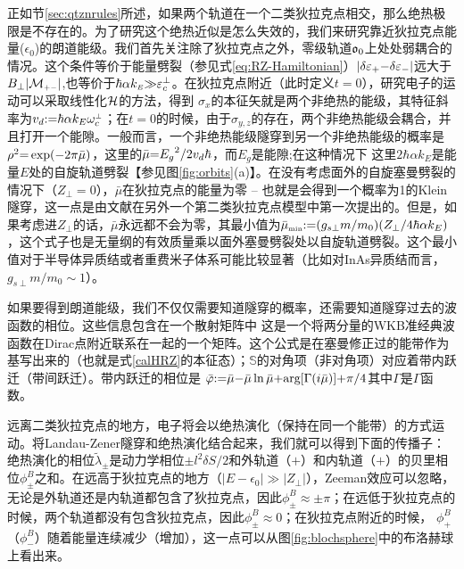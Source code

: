 正如节\ref{sec:qtznrules}所述，如果两个轨道在一个二类狄拉克点相交，那么绝热极限是不存在的。为了研究这个绝热近似是怎么失效的，我们来研究靠近狄拉克点能量($\epsilon_0$)的朗道能级。我们首先关注除了狄拉克点之外，零级轨道$\mathfrak{o}_0$上处处弱耦合的情况。这个条件等价于能量劈裂（参见式\ref{eq:RZ-Hamiltonian}）$|\delta \varepsilon_+{-}\delta \varepsilon_-|$远大于$B_\perp|{\cal M}_{\scriptscriptstyle{+-}}|$,也等价于$\hbar\alpha k_{\scriptscriptstyle{E}}{\gg}\varepsilon_c^\perp$。在狄拉克点附近（此时定义$t{=}0$），研究电子的运动可以采取线性化$\mathcal{H}$的方法，得到
$\sigma_x$的本征矢就是两个非绝热的能级，其特征斜率为$v_d{:}{=}\hbar\alpha k_E\omega^{\scriptscriptstyle{\perp}}_c$；在$t{=}0$的时候，由于$\sigma_{y,z}$的存在，两个非绝热能级会耦合，并且打开一个能隙。一般而言，一个非绝热能级隧穿到另一个非绝热能级的概率是$\rho^2{=}\exp(-2\pi\bar{\mu})$，这里的$\bar{\mu}{=}{E_g}^2/{2v_d \hbar}$，而$E_g$是能隙\cite{wittig_landauzener_2005,lifshitz_e.m._quantum_1991};在这种情况下
这里$2\hbar\alpha k_E$是能量$E$处的自旋轨道劈裂【参见图\ref{fig:orbits}(a)】。在没有考虑面外的自旋塞曼劈裂的情况下（$Z_\perp{=}0$），$\bar{\mu}$在狄拉克点的能量为零 -- 也就是会得到一个概率为1的Klein隧穿，这一点是由文献在另外一个第二类狄拉克点模型中第一次提出的。但是，如果考虑进$Z_\perp$的话，$\bar{\mu}$永远都不会为零，其最小值为$\bar{\mu}_{\scriptscriptstyle{\text{min}}}{:}{=} (g_{s\perp} m/m_0)(Z_\perp/4\hbar\alpha k_{E})$，这个式子也是无量纲的有效质量乘以面外塞曼劈裂处以自旋轨道劈裂。这个最小值对于半导体异质结或者重费米子体系可能比较显著（比如对InAs异质结而言，$g_{s\perp}m/m_0{\sim} 1$）。


如果要得到朗道能级，我们不仅仅需要知道隧穿的概率，还需要知道隧穿过去的波函数的相位。这些信息包含在一个散射矩阵中\cite{AALG,kaganov_coherent_1983}
这是一个将两分量的WKB准经典波函数在Dirac点附近联系在一起的一个矩阵。这个公式是在塞曼修正过的能带作为基写出来的（也就是式\ref{calHRZ}的本征态）；$\mathbb{S}$的对角项（非对角项）对应着带内跃迁（带间跃迁）。带内跃迁的相位是 $\bar{\varphi}{:}{=}\bar{\mu}{-}\bar{\mu}\ln\bar{\mu}{+}\text{arg}[\Gamma(i\bar{\mu})]{+}\pi/4$其中$\Gamma$是$\Gamma$函数。

远离二类狄拉克点的地方，电子将会以绝热演化（保持在同一个能带）的方式运动。将Landau-Zener隧穿和绝热演化结合起来，我们就可以得到下面的传播子：
绝热演化的相位$\tilde{\lambda}_{\pm}$是动力学相位${\pm} l^2 \delta S/2$和外轨道（$+$）和内轨道（$+$）的贝里相位$\phi^B_\pm$之和。在远高于狄拉克点的地方（$|E{-}\epsilon_0|{\gg}|Z_{\perp}|$），Zeeman效应可以忽略，无论是外轨道还是内轨道都包含了狄拉克点，因此$\phi_{\pm}^B{\approx}{\pm}\pi$；在远低于狄拉克点的时候，两个轨道都没有包含狄拉克点，因此$\phi_{\pm}^B{\approx}0$；在狄拉克点附近的时候， $\phi_{+}^B$（$\phi_{-}^B$）随着能量连续减少（增加），这一点可以从图\ref{fig:blochsphere}中的布洛赫球上看出来。

